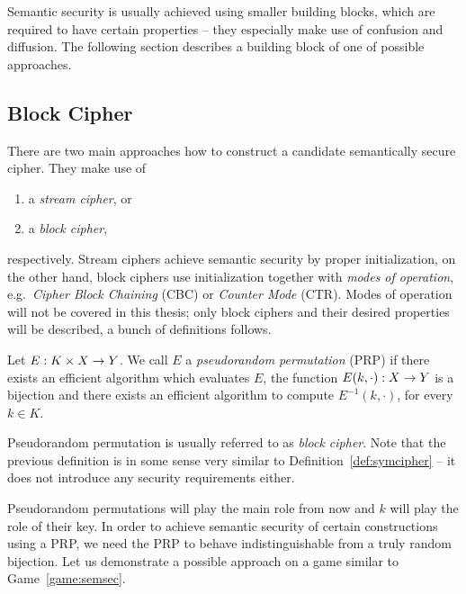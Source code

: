 	Semantic security is usually achieved using smaller building blocks, which are required to have certain properties -- they especially make use of confusion and diffusion. The following section describes a building block of one of possible approaches.



\subsection{Block Cipher}

There are two main approaches how to construct a candidate semantically secure cipher. They make use of
\begin{enumerate}
	\item a {\em stream cipher}, or
	\item a {\em block cipher},
\end{enumerate}
respectively. Stream ciphers achieve semantic security by proper initialization, on the other hand, block ciphers use initialization together with {\em modes of operation}, e.g.\ {\em Cipher Block Chaining} (CBC) or {\em Counter Mode} (CTR). Modes of operation will not be covered in this thesis; only block ciphers and their desired properties will be described, a bunch of definitions follows.

\begin{defn}
\label{def:prp}
	Let $E: K\times X\rightarrow Y$. We call $E$ a {\em pseudorandom permutation} (PRP) if there exists an efficient algorithm which evaluates $E$, the function $E(k,\cdot): X\rightarrow Y$ is a bijection and there exists an efficient algorithm to compute $E^{-1}(k,\cdot)$, for every $k\in K$.
\end{defn}

\begin{note}
	Pseudorandom permutation is usually referred to as {\em block cipher}. Note that the previous definition is in some sense very similar to Definition~\ref{def:symcipher} -- it does not introduce any security requirements either.
\end{note}

Pseudorandom permutations will play the main role from now and $k$ will play the role of their key. In order to achieve semantic security of certain constructions using a PRP, we need the PRP to behave indistinguishable from a truly random bijection. Let us demonstrate a possible approach on a game similar to Game~\ref{game:semsec}.

